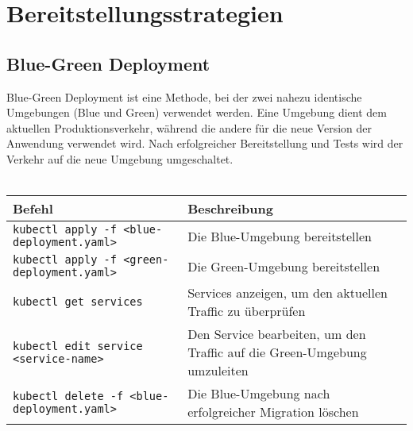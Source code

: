 \chapter{Bereitstellungsstrategien}

\section{Blue-Green Deployment}
Blue-Green Deployment ist eine Methode, bei der zwei nahezu identische Umgebungen (Blue und Green) verwendet werden. Eine Umgebung dient dem aktuellen Produktionsverkehr, während die andere für die neue Version der Anwendung verwendet wird. Nach erfolgreicher Bereitstellung und Tests wird der Verkehr auf die neue Umgebung umgeschaltet.\\
\phantom{.}\\
\begin{tabular}{|p{}|p{}|}
\hline
\textbf{Befehl} & \textbf{Beschreibung} \\
\hline
\texttt{kubectl apply -f <blue-deployment.yaml>} & Die Blue-Umgebung bereitstellen \\
\texttt{kubectl apply -f <green-deployment.yaml>} & Die Green-Umgebung bereitstellen \\
\texttt{kubectl get services} & Services anzeigen, um den aktuellen Traffic zu überprüfen \\
\texttt{kubectl edit service <service-name>} & Den Service bearbeiten, um den Traffic auf die Green-Umgebung umzuleiten \\
\texttt{kubectl delete -f <blue-deployment.yaml>} & Die Blue-Umgebung nach erfolgreicher Migration löschen \\
\hline
\end{tabular}

